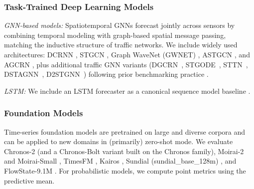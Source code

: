 \documentclass[10pt]{article}
\begin{document}
\subsubsection{Task-Trained Deep Learning  Models}


\textit{GNN-based models:}
Spatiotemporal GNNs forecast jointly across sensors by combining temporal modeling with graph-based spatial
message passing, matching the inductive structure of traffic networks. We include widely used architectures:
DCRNN \cite{li2018dcrnn}, STGCN \cite{yu2018stgcn}, Graph WaveNet (GWNET) \cite{wu2019graphwavenet},
ASTGCN \cite{guo2019attention}, and AGCRN \cite{bai2020adaptive}, plus additional traffic GNN variants
(DGCRN~\cite{li2021dynamic}, STGODE~\cite{fang2021spatial}, STTN~\cite{xu2020spatial}, DSTAGNN~\cite{lan2022dstagnn}, D2STGNN~\cite{shao2022decoupled}) following prior benchmarking practice \cite{liu2023needgnn,lan2022dstagnn}.

\textit{LSTM:}
We include an LSTM forecaster as a canonical sequence model baseline \cite{hochreiter1997lstm}.

\subsubsection{Foundation Models}
Time-series foundation models are pretrained on large and diverse corpora and can be applied to new domains
in (primarily) zero-shot mode. We evaluate Chronos-2 \cite{ansari2024chronos} (and a Chronos-Bolt variant built
on the Chronos family), Moirai-2 and Moirai-Small \cite{woo2024moirai},
TimesFM \cite{das2024timesfm}, Kairos \cite{feng2025kairos}, Sundial (sundial\_base\_128m) \cite{liu2025sundial},
and FlowState-9.1M \cite{graf2025flowstate}. For probabilistic models, we compute point metrics using the predictive mean.




\end{document}
